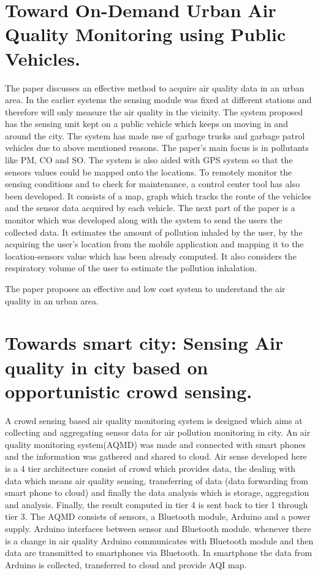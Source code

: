 \documentclass[11pt]{article}
\begin{document}
\section{Toward On-Demand Urban Air Quality Monitoring using Public Vehicles.}\cite{Shirai2016}

The paper discusses an effective method to acquire air quality data in an urban area. In the earlier systems the sensing module was fixed at different stations and therefore will only measure the air quality in the vicinity. The system proposed has the sensing unit kept on a public vehicle which keeps on moving in and around the city. The system has made use of garbage trucks and garbage patrol vehicles due to above mentioned reasons. The paper's main focus is in pollutants like PM, CO and SO. The system is also aided with GPS system so that the sensors values could be mapped onto the locations. To remotely monitor the sensing conditions and to check for maintenance, a control center tool has also been developed. It consists of a map, graph which tracks the route of the vehicles and the sensor data acquired by each vehicle. The next part of the paper is a monitor which was developed along with the system to send the users the collected data. It estimates the amount of pollution inhaled by the user, by the acquiring the user's location from the mobile application and mapping it to the location-sensors value which has been already computed. It also considers the respiratory volume of the user to estimate the pollution inhalation.

The paper proposes an effective and low cost system to understand the air quality in an urban area.

\section{Towards smart city: Sensing Air quality in city based on opportunistic crowd sensing.} \cite{Dutta2017}

A crowd sensing based air quality monitoring system is designed which aims at collecting and aggregating sensor data for air pollution monitoring in city. An air quality monitoring system(AQMD) was made and connected with smart phones and the information was gathered and shared to cloud. Air sense developed here is a 4 tier architecture consist of crowd which provides data, the dealing with data which means air quality sensing, transferring of data (data forwarding from smart phone to cloud) and finally the data analysis which is storage, aggregation and analysis. Finally, the result computed in tier 4 is sent back to tier 1 through tier 3. The AQMD consists of sensors, a Bluetooth module, Arduino and a power supply. Arduino interfaces between sensor and Bluetooth module. whenever there is a change in air quality Arduino communicates with Bluetooth module and then data are transmitted to smartphones via Bluetooth. In smartphone the data from Arduino is collected, transferred to cloud and provide AQI map.
\end{document}
